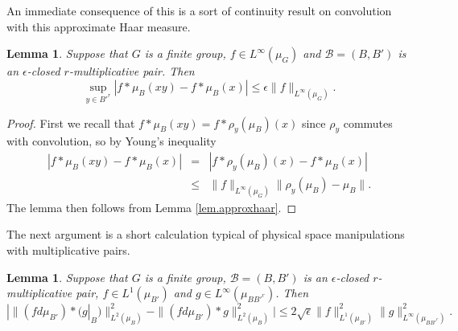 \documentclass[12pt]{amsart}
\numberwithin{equation}{section}
\theoremstyle{plain}
\newtheorem{lemma}[subsection]{Lemma}
\theoremstyle{definition}
\renewcommand{\leq}{\leqslant}
\begin{document}
An immediate consequence of this is  a sort of continuity result on convolution with this approximate Haar measure.
 \begin{lemma}\label{lem.appcon}
 Suppose that $G$ is a finite group, $f \in L^\infty(\mu_G)$ and $\mathcal{B}=(B,B')$ is an $\epsilon$-closed $r$-multiplicative pair. Then
 \begin{equation*}
 \sup_{y \in B'^r}{|f \ast \mu_{B}(xy) - f\ast \mu_B(x)|} \leq \epsilon \|f\|_{L^\infty(\mu_G)}.
 \end{equation*}
 \end{lemma}
 \begin{proof}
First we recall that $f \ast \mu_{B}(xy) =f \ast \rho_y(\mu_B)(x)$ since $\rho_y$ commutes with convolution, so by Young's inequality
\begin{eqnarray*}
|f \ast \mu_{B}(xy) - f\ast \mu_B(x)| & = & |f \ast \rho_y(\mu_{B})(x) - f\ast \mu_B(x)|\\ & \leq & \|f\|_{L^\infty(\mu_G)}\|\rho_y(\mu_B)-\mu_B\|.
\end{eqnarray*}
The lemma then follows from Lemma \ref{lem.approxhaar}.
 \end{proof}
The next argument is a short calculation typical of physical space manipulations with multiplicative pairs.
\begin{lemma}\label{lem.bogcalc}
Suppose that $G$ is a finite group, $\mathcal{B}=(B,B')$ is an $\epsilon$-closed $r$-multiplicative pair, $f  \in L^1(\mu_{B'})$ and $g \in L^\infty(\mu_{BB'^r})$. Then
\begin{equation*}
|\|(fd\mu_{B'}) \ast (g|_B)\|_{L^2(\mu_B)}^2 - \|(fd\mu_{B'}) \ast g\|_{L^2(\mu_B)}^2 | \leq 2\sqrt{\epsilon}\|f\|_{L^1(\mu_{B'})}^2\|g\|_{L^\infty(\mu_{BB'^r})}^2.
\end{equation*}
\end{lemma} 
\end{document}
